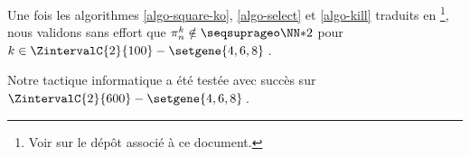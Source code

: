 \leavevmode
\smallskip

Une fois les algorithmes \ref{algo-square-ko}, \ref{algo-select} et \ref{algo-kill} traduits en \python
\footnote{
	Voir sur le dépôt associé à ce document.
},
nous validons sans effort que $\consprod \notin \NNssquare$ pour $k \in \ZintervalC{2}{100} - \setgene{4, 6, 8}$\,.


\begin{remark}
	Notre tactique informatique a été testée avec succès sur $\ZintervalC{2}{600} - \setgene{4, 6, 8}$\,.
\end{remark}
